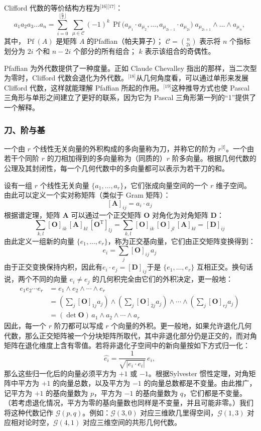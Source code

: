Clifford 代数的等价结构方程为\(^\text{[16][17]}\)：
$$
a_1 a_2 a_3 \dots a_n
=\sum_{i=0}^{\lfloor \frac{n}{2} \rfloor}\;
\sum_{\mu \in \mathcal{C}}
(-1)^k \, \operatorname{Pf}\!\bigl(a_{\mu_1}\cdot a_{\mu_2},\dots,a_{\mu_{2i-1}}\cdot a_{\mu_{2i}}\bigr)\;
a_{\mu_{2i+1}} \wedge \dots \wedge a_{\mu_n},~
$$
其中，$\operatorname{Pf}(A)$ 是矩阵 $A$ 的Pfaffian（帕夫算子）；
$\mathcal{C}={\binom{n}{2i}}$ 表示将 $n$ 个指标划分为 $2i$ 个和 $n-2i$ 个部分的所有组合；
$k$ 表示该组合的奇偶性。

Pfaffian 为外代数提供了一种度量。正如 Claude Chevalley 指出的那样，当二次型为零时，Clifford 代数会退化为外代数。\(^\text{[18]}\)从几何角度看，可以通过单形来发展 Clifford 代数，这样就能理解 Pfaffian 所起的作用。\(^\text{[19]}\)这种推导方式也使 Pascal 三角形与单形之间建立了更好的联系，因为它为 Pascal 三角形第一列的“1”提供了一个解释。
\subsubsection{刀、阶与基}
一个由 $r$ 个线性无关向量的外积构成的多向量称为刀，并称它的阶为 $r$\(^\text{[f]}\)。一个由若干个同阶 $r$ 的刀相加得到的多向量称为（同质的）$r$ 阶多向量。根据几何代数的公理及其封闭性，每一个几何代数中的多向量都可以表示为若干刀的和。

设有一组 $r$ 个线性无关向量 $\{a_{1}, \ldots, a_{r}\}$，它们张成向量空间的一个 $r$ 维子空间。由此可以定义一个实对称矩阵（类似于 Gram 矩阵）：
$$
[\mathbf{A}]_{ij} = a_i \cdot a_j~
$$
根据谱定理，矩阵 $\mathbf{A}$ 可以通过一个正交矩阵 $\mathbf{O}$ 对角化为对角矩阵 $\mathbf{D}$：
$$
\sum_{k,l} [\mathbf{O}]_{ik}\,[\mathbf{A}]_{kl}\,[\mathbf{O}^{\mathrm{T}}]_{lj}
= \sum_{k,l} [\mathbf{O}]_{ik}\,[\mathbf{O}]_{jl}\,[\mathbf{A}]_{kl}
= [\mathbf{D}]_{ij}~
$$
由此定义一组新的向量 $\{e_{1}, \ldots, e_{r}\}$，称为正交基向量，它们由正交矩阵变换得到：
$$
e_i = \sum_{j} [\mathbf{O}]_{ij}\, a_j~
$$
由于正交变换保持内积，因此有$e_i \cdot e_j = [\mathbf{D}]_{ij}$于是 $\{e_1, \ldots, e_r\}$ 互相正交。换句话说，两个不同的向量 $e_i \neq e_j$ 的几何积完全由它们的外积决定，更一般地：
$$
\begin{aligned}
e_1 e_2 \cdots e_r 
&= e_1 \wedge e_2 \wedge \cdots \wedge e_r \\
&=\left(\sum_{j} [\mathbf{O}]_{1j} a_j\right) \wedge 
  \left(\sum_{j} [\mathbf{O}]_{2j} a_j\right) \wedge \cdots \wedge 
  \left(\sum_{j} [\mathbf{O}]_{rj} a_j\right) \\
&= (\det \mathbf{O}) \, a_1 \wedge a_2 \wedge \cdots \wedge a_r
\end{aligned}~
$$
因此，每一个 $r$ 阶刀都可以写成 $r$ 个向量的外积。更一般地，如果允许退化几何代数，那么正交矩阵被一个分块矩阵所取代，其中非退化部分仍是正交的，而对角矩阵在退化维度上含有零值。若将非退化子空间中的新向量按如下方式归一化：
$$
\widehat{e_i} = \frac{1}{\sqrt{|e_i \cdot e_i|}} \, e_i,~
$$
那么这些归一化后的向量必须平方为 $+1$ 或 $-1$。根据Sylvester 惯性定理，对角矩阵中平方为 $+1$ 的向量总数，以及平方为 $-1$ 的向量总数都是不变量。由此推广，记平方为 $+1$ 的基向量数为 $p$，平方为 $-1$ 的基向量数为 $q$，它们都是不变量。（若考虑退化情况，平方为零的基向量数也同样是不变量，并且可能非零。）我们将这种代数记作 $\mathcal{G}(p,q)$。例如：$\mathcal{G}(3,0)$ 对应三维欧几里得空间，$\mathcal{G}(1,3)$ 对应相对论时空，$\mathcal{G}(4,1)$ 对应三维空间的共形几何代数。

